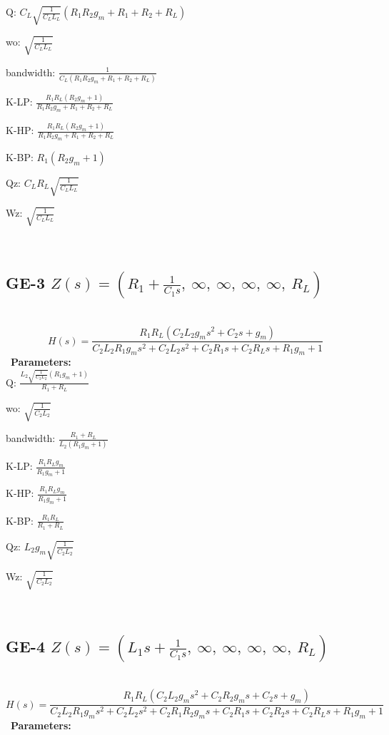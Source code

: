 \documentclass{article}
\begin{document}
Q: $C_{L} \sqrt{\frac{1}{C_{L} L_{L}}} \left(R_{1} R_{2} g_{m} + R_{1} + R_{2} + R_{L}\right)$\ 

wo: $\sqrt{\frac{1}{C_{L} L_{L}}}$\ 

bandwidth: $\frac{1}{C_{L} \left(R_{1} R_{2} g_{m} + R_{1} + R_{2} + R_{L}\right)}$\ 

K-LP: $\frac{R_{1} R_{L} \left(R_{2} g_{m} + 1\right)}{R_{1} R_{2} g_{m} + R_{1} + R_{2} + R_{L}}$\ 

K-HP: $\frac{R_{1} R_{L} \left(R_{2} g_{m} + 1\right)}{R_{1} R_{2} g_{m} + R_{1} + R_{2} + R_{L}}$\ 

K-BP: $R_{1} \left(R_{2} g_{m} + 1\right)$\ 

Qz: $C_{L} R_{L} \sqrt{\frac{1}{C_{L} L_{L}}}$\ 

Wz: $\sqrt{\frac{1}{C_{L} L_{L}}}$\ 

\ 

\subsection{GE-3 $Z(s) = \left( R_{1} + \frac{1}{C_{1} s}, \  \infty, \  \infty, \  \infty, \  \infty, \  R_{L}\right)$ } \ 
\textbf{\[H(s) = \frac{R_{1} R_{L} \left(C_{2} L_{2} g_{m} s^{2} + C_{2} s + g_{m}\right)}{C_{2} L_{2} R_{1} g_{m} s^{2} + C_{2} L_{2} s^{2} + C_{2} R_{1} s + C_{2} R_{L} s + R_{1} g_{m} + 1}\] } \ 
\textbf{Parameters:}\\ 

Q: $\frac{L_{2} \sqrt{\frac{1}{C_{2} L_{2}}} \left(R_{1} g_{m} + 1\right)}{R_{1} + R_{L}}$\ 

wo: $\sqrt{\frac{1}{C_{2} L_{2}}}$\ 

bandwidth: $\frac{R_{1} + R_{L}}{L_{2} \left(R_{1} g_{m} + 1\right)}$\ 

K-LP: $\frac{R_{1} R_{L} g_{m}}{R_{1} g_{m} + 1}$\ 

K-HP: $\frac{R_{1} R_{L} g_{m}}{R_{1} g_{m} + 1}$\ 

K-BP: $\frac{R_{1} R_{L}}{R_{1} + R_{L}}$\ 

Qz: $L_{2} g_{m} \sqrt{\frac{1}{C_{2} L_{2}}}$\ 

Wz: $\sqrt{\frac{1}{C_{2} L_{2}}}$\ 

\ 

\subsection{GE-4 $Z(s) = \left( L_{1} s + \frac{1}{C_{1} s}, \  \infty, \  \infty, \  \infty, \  \infty, \  R_{L}\right)$ } \ 
\textbf{\[H(s) = \frac{R_{1} R_{L} \left(C_{2} L_{2} g_{m} s^{2} + C_{2} R_{2} g_{m} s + C_{2} s + g_{m}\right)}{C_{2} L_{2} R_{1} g_{m} s^{2} + C_{2} L_{2} s^{2} + C_{2} R_{1} R_{2} g_{m} s + C_{2} R_{1} s + C_{2} R_{2} s + C_{2} R_{L} s + R_{1} g_{m} + 1}\] } \ 
\textbf{Parameters:}\\ 
\end{document}
